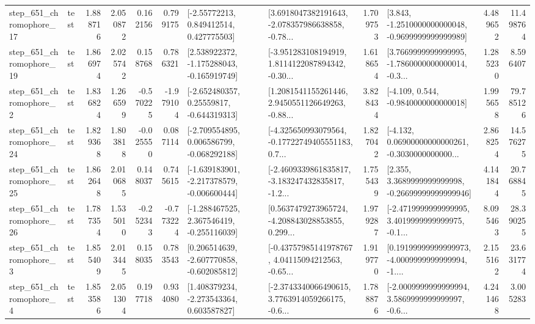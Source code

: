 \begin{tabular}{llrrrrllrlrr}
  step\_651\_chromophore\_17 &      test &      1.888716 &    2.050872 &      0.162156 &  0.799175 &     [-2.55772213, 0.849412514, 0.427775503] &  [3.6918047382191643, -2.078357986638858, -0.78... &       1.709753 &  [3.843, -1.2510000000000048, -0.9699999999999989] &            4.489652 &         11.498764 \\
  step\_651\_chromophore\_19 &      test &      1.866974 &    2.025742 &      0.158768 &  0.786321 &   [2.538922372, -1.175288043, -0.165919749] &  [-3.951283108194919, 1.8114122087894342, -0.30... &       1.618654 &  [3.7669999999999995, -1.7860000000000014, -0.3... &            1.285230 &          8.596407 \\
   step\_651\_chromophore\_2 &      test &      1.836824 &    1.266599 &     -0.570225 & -1.979104 &    [-2.652480357, 0.25559817, -0.644319313] &  [1.2081541155261446, 2.9450551126649263, -0.88... &       3.828434 &               [-4.109, 0.544, -0.9840000000000018] &            1.995658 &         79.785126 \\
  step\_651\_chromophore\_24 &      test &      1.829368 &    1.803818 &     -0.025550 &  0.087114 &   [-2.709554895, 0.006586799, -0.068292188] &  [-4.325650993079564, -0.17722749405551183, 0.7... &       1.827042 &  [-4.132, 0.06900000000000261, -0.3030000000000... &            2.868254 &         14.576275 \\
  step\_651\_chromophore\_25 &      test &      1.862648 &    2.010685 &      0.148037 &  0.745615 &  [-1.639183901, -2.217378579, -0.006600444] &  [-2.4609339861835817, -3.183247432835817, -1.2... &       1.755439 &  [2.355, 3.3689999999999998, -0.26699999999999946] &            4.141844 &         20.768845 \\
  step\_651\_chromophore\_26 &      test &      1.787354 &    1.535010 &     -0.252343 & -0.773224 &   [-1.288467525, 2.367546419, -0.255116039] &  [0.5637479273965724, -4.208843028853855, 0.299... &       1.979287 &  [-2.4719999999999995, 3.4019999999999975, -0.1... &            8.095463 &         28.390255 \\
   step\_651\_chromophore\_3 &      test &      1.855409 &    2.013445 &      0.158035 &  0.783543 &   [0.206514639, -2.607770858, -0.602085812] &  [-0.43757985141978767, 4.04115094212563, -0.65... &       1.919770 &  [0.19199999999999973, -4.0009999999999994, -1.... &            2.155162 &         23.631774 \\
   step\_651\_chromophore\_4 &      test &      1.853586 &    2.051304 &      0.197718 &  0.934080 &    [1.408379234, -2.273543364, 0.603587827] &  [-2.3743340066490615, 3.7763914059266175, -0.6... &       1.788876 &  [-2.0009999999999994, 3.5869999999999997, -0.6... &            4.241468 &          3.005283 \\

\end{tabular}
